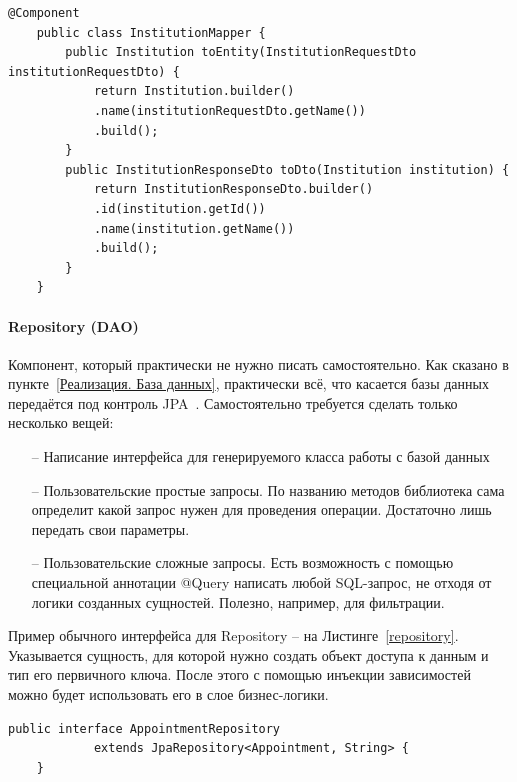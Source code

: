 \documentclass[a4paper,article]{article}
\begin{document}
\begin{sloppypar}
   \begin{lstlisting}[label=mapper,caption=Пример класса-маппера]
    @Component
    public class InstitutionMapper {
        public Institution toEntity(InstitutionRequestDto institutionRequestDto) {
            return Institution.builder()
            .name(institutionRequestDto.getName())
            .build();
        }
        public InstitutionResponseDto toDto(Institution institution) {
            return InstitutionResponseDto.builder()
            .id(institution.getId())
            .name(institution.getName())
            .build();
        }
    }
    \end{lstlisting}

    \paragraph{Repository (DAO)}\label{Реализация. Сервер. Repository}

    Компонент, который практически не нужно писать самостоятельно. Как сказано в пункте~\ref{Реализация. База данных}, практически всё, что касается базы данных передаётся под контроль JPA~\cite{springguide}. Самостоятельно требуется сделать только несколько вещей:

    \begin{itemize}[nolistsep]
        \item[--] Написание интерфейса для генерируемого класса работы с базой данных
        \item[--] Пользовательские простые запросы. По названию методов библиотека сама определит какой запрос нужен для проведения операции. Достаточно лишь передать свои параметры.
        \item[--] Пользовательские сложные запросы. Есть возможность с помощью специальной аннотации @Query написать любой SQL-запрос, не отходя от логики созданных сущностей. Полезно, например, для фильтрации.
    \end{itemize}

    \newpage

    Пример обычного интерфейса для Repository -- на Листинге~\ref{repository}. Указывается сущность, для которой нужно создать объект доступа к данным и тип его первичного ключа. После этого с помощью инъекции зависимостей~\cite{springguide} можно будет использовать его в слое бизнес-логики.

    \begin{lstlisting}[label=repository,caption=Пример интерфейса для репозитория]
    public interface AppointmentRepository
            extends JpaRepository<Appointment, String> {
    }
    \end{lstlisting}


\end{sloppypar}
\end{document}
